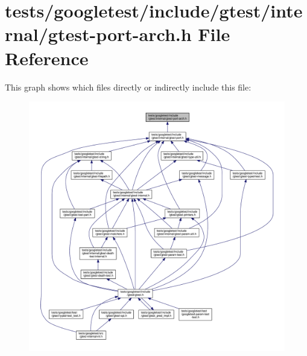 \hypertarget{gtest-port-arch_8h}{}\section{tests/googletest/include/gtest/internal/gtest-\/port-\/arch.h File Reference}
\label{gtest-port-arch_8h}
This graph shows which files directly or indirectly include this file\+:\nopagebreak
\begin{figure}[H]
\begin{center}
\leavevmode
\includegraphics[width=350pt]{gtest-port-arch_8h__dep__incl}
\end{center}
\end{figure}
